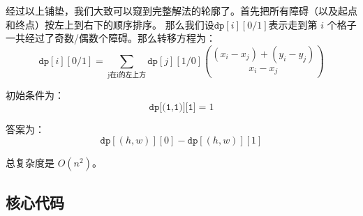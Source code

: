 经过以上铺垫，我们大致可以窥到完整解法的轮廓了。首先把所有障碍（以及起点和终点）按左上到右下的顺序排序。
那么我们设$\texttt{dp}[i][0/1]$表示走到第 $i$ 个格子一共经过了奇数/偶数个障碍。那么转移方程为：
$$
\texttt{dp}[i][0/1] = \sum_{\text{j在i的左上方}} \texttt{dp}[j][1/0] \binom{(x_i-x_j)+(y_i-y_j)}{x_i-x_j}  
$$

初始条件为：
$$
\texttt{dp[(1,1)][1]} = 1
$$

答案为：
$$
\texttt{dp}[(h,w)][0] - \texttt{dp}[(h,w)][1] 
$$

总复杂度是 $O(n^2)$。

\subsection*{核心代码}
\inputminted[linenos,autogobble]{cpp}{./Code/Y.cpp}
\newpage